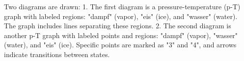 Two diagrams are drawn:  
1. The first diagram is a pressure-temperature (p-T) graph with labeled regions: "dampf" (vapor), "eis" (ice), and "wasser" (water). The graph includes lines separating these regions.  
2. The second diagram is another p-T graph with labeled points and regions: "dampf" (vapor), "wasser" (water), and "eis" (ice). Specific points are marked as "3" and "4", and arrows indicate transitions between states.